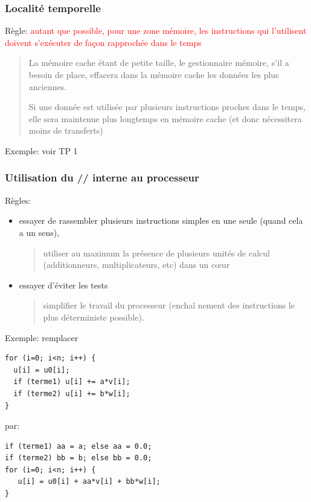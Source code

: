 \documentclass{beamer}
\begin{document}
\begin{frame}
\frametitle{Localit\'e temporelle}
Règle: 
	\textcolor{red}{autant que possible, pour une zone m\'emoire, les instructions qui l'utilisent doivent s'ex\'ecuter de façon rapproch\'ee dans le temps}
	
	\begin{quote}
		La m\'emoire cache \'etant de petite taille, le gestionnaire m\'emoire, s'il a besoin de place, effacera dans la m\'emoire cache les donn\'ees les plus anciennes.
		
		Si une donn\'ee est utilis\'ee par plusieurs instructions proches dans le temps, elle sera maintenue plus longtemps en m\'e\-moi\-re cache (et donc n\'ecessitera moins de transferts)
	\end{quote}
Exemple: voir TP 1
\end{frame}

\begin{frame}[fragile]
\frametitle{Utilisation du // interne au processeur}
Règles: 
\begin{itemize}
	\item essayer de rassembler plusieurs instructions simples en une seule (quand cela a un sens),
	\begin{quote}
		utiliser au maximum la pr\'esence de plusieurs unit\'es de calcul (additionneurs, multiplicateurs, etc) dans un c\oe ur
	\end{quote}
	\item  essayer d'\'eviter les tests
	\begin{quote}
		simplifier le travail du processeur (encha\^i nement des instructions le plus d\'eterministe possible).
	\end{quote}
\end{itemize}


\end{frame}

\begin{frame}[fragile]
Exemple: remplacer
\begin{lstlisting}
for (i=0; i<n; i++) {
  u[i] = u0[i];
  if (terme1) u[i] += a*v[i];
  if (terme2) u[i] += b*w[i];
}
\end{lstlisting}

par:
\begin{lstlisting}
if (terme1) aa = a; else aa = 0.0;
if (terme2) bb = b; else bb = 0.0;
for (i=0; i<n; i++) {
   u[i] = u0[i] + aa*v[i] + bb*w[i];
}
\end{lstlisting}

\end{frame}
\end{document}
